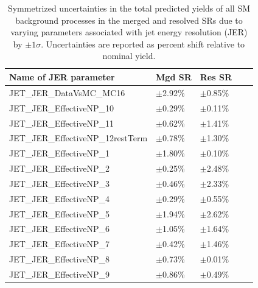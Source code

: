 \begin{table}[ht]
\caption[Symmetrized uncertainties in the total predicted yields of all SM background processes in the signal regions associated with jet energy resolution.]{\label{tab:systs_total_bkg_JET_JER_SR} Symmetrized uncertainties in the total predicted yields of all SM background processes in the merged and resolved SRs due to varying parameters associated with jet energy resolution (JER) by \(\pm1\sigma\). Uncertainties are reported as percent shift relative to nominal yield.}
\footnotesize{
\begin{tabular}{l l l l l }
\toprule
\textbf{Name of JER parameter} & \textbf{Mgd SR} & \textbf{Res SR}\tabularnewline
\midrule
\midrule
JET\_JER\_DataVsMC\_MC16 & \(\pm\)2.92\% &\(\pm\)0.85\% \tabularnewline
\midrule
JET\_JER\_EffectiveNP\_10 & \(\pm\)0.29\% &\(\pm\)0.11\% \tabularnewline
\midrule
JET\_JER\_EffectiveNP\_11 & \(\pm\)0.62\% &\(\pm\)1.41\% \tabularnewline
\midrule
JET\_JER\_EffectiveNP\_12restTerm & \(\pm\)0.78\% &\(\pm\)1.30\% \tabularnewline
\midrule
JET\_JER\_EffectiveNP\_1 & \(\pm\)1.80\% &\(\pm\)0.10\% \tabularnewline
\midrule
JET\_JER\_EffectiveNP\_2 & \(\pm\)0.25\% &\(\pm\)2.48\% \tabularnewline
\midrule
JET\_JER\_EffectiveNP\_3 & \(\pm\)0.46\% &\(\pm\)2.33\% \tabularnewline
\midrule
JET\_JER\_EffectiveNP\_4 & \(\pm\)0.29\% &\(\pm\)0.55\% \tabularnewline
\midrule
JET\_JER\_EffectiveNP\_5 & \(\pm\)1.94\% &\(\pm\)2.62\% \tabularnewline
\midrule
JET\_JER\_EffectiveNP\_6 & \(\pm\)1.05\% &\(\pm\)1.64\% \tabularnewline
\midrule
JET\_JER\_EffectiveNP\_7 & \(\pm\)0.42\% &\(\pm\)1.46\% \tabularnewline
\midrule
JET\_JER\_EffectiveNP\_8 & \(\pm\)0.73\% &\(\pm\)0.01\% \tabularnewline
\midrule
JET\_JER\_EffectiveNP\_9 & \(\pm\)0.86\% &\(\pm\)0.49\% \tabularnewline
\bottomrule
\end{tabular}}
\end{table}

